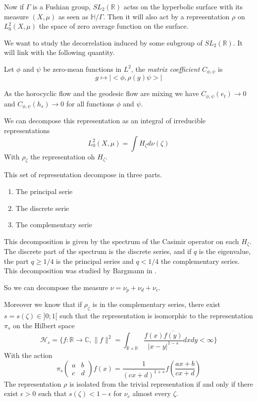 Now if $\Gamma$ is a Fushian group, $SL_2(\mathbb{R})$ actss on the hyperbolic surface with its measure $(X,\mu)$ as seen as $\mathbb{H}/ \Gamma$.
Then it will also act by a representation $\rho$ on $L^2_0(X,\mu)$ the space of zero average function on the surface.

We want to study the decorrelation induced by some subgroup of $SL_2(\mathbb{R})$. It will link with the following quantity.

\begin{dfnt}
Let $\phi$ and $\psi$ be zero-mean functions in $L^2$, the \emph{matrix coefficient} $C_{\phi,\psi}$ is\[
g \mapsto |<\phi, \rho(g) \psi>|
\]
\end{dfnt}

\begin{rmq}
As the horocyclic flow and the geodesic flow are mixing we have $C_{\phi,\psi}(e_t) \to 0$ and $C_{\phi,\psi}(h_s) \to 0$ for all functions $\phi$ and $\psi$.
\end{rmq}

We can decompose this representation as an integral of irreducible representations \[
L^2_0(X,\mu)=\int H_\zeta d \nu(\zeta)
\]
With $\rho_{\zeta}$ the representation oh $H_{\zeta}$.

This set of representation decompose in three parts. \begin{enumerate}
\item The principal serie
\item The discrete serie
\item The complementary serie
\end{enumerate}

This decomposition is given by the spectrum of the Casimir operator on each $H_\zeta$.
The discrete part of the spectrum is the discrete series, and if $q$ is the eigenvalue, the part $q \geq 1/4$ is the principal series and $q < 1/4$ the complementary series. This decomposition was studied by Bargmann in \cite{10.2307/1969129}.

So we can decompose the measure $\nu=\nu_p + \nu_d + \nu_c$.

Moreover we know that if $\rho_\zeta$ is in the complementary series, there exist $s=s(\zeta) \in ]0;1[$ such that the representation is isomorphic to the representation $\pi_s$ on the Hilbert space \[
\mathcal{H}_s =
\{ f:\mathbb{R} \to \mathbb{C}
, \|f \|^2 = \int_{\mathbb{R} \times \mathbb{R}}
 \frac{f(x) \overline{f(y)}}{|x-y|^{1-s}}dxdy < \infty\}
\]
With the action \[
\pi_s \begin{pmatrix}a & b \\c & d \end{pmatrix}f(x)=\frac{1}{(cx+d)^{1+s}}f(\frac{ax+b}{cx+d})
\]
The representation $\rho$ is isolated from the trivial representation if and only if there exist $\epsilon >0$ such that $s(\zeta)<1-\epsilon$ for $\nu_c$ almost every $\zeta$.


